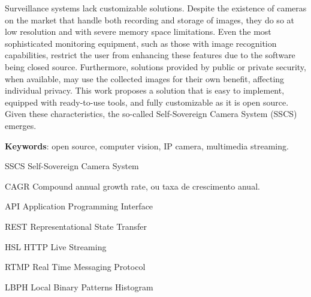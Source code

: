 \documentclass[12pt, %
openright, 
oneside, %
a4paper,    %
brazil]{facom-ufu-abntex2}
\begin{document}
\begin{resumo}[Abstract]

	Surveillance systems lack customizable solutions. Despite the existence of
	cameras on the market that handle both recording and storage of images, they do
	so at low resolution and with severe memory space limitations. Even the most
	sophisticated monitoring equipment, such as those with image recognition
	capabilities, restrict the user from enhancing these features due to the
	software being closed source. Furthermore, solutions provided by public or
	private security, when available, may use the collected images for their own
	benefit, affecting individual privacy. This work proposes a solution that is
	easy to implement, equipped with ready-to-use tools, and fully customizable as
	it is open source. Given these characteristics, the so-called Self-Sovereign
	Camera System (SSCS) emerges.

	\vspace{\onelineskip}
	\noindent
	\textbf{Keywords}: open source, computer vision, IP camera, multimedia streaming.
\end{resumo}

\listoffigures*
\cleardoublepage

\listoftables*
\cleardoublepage

\begin{siglas} %

	\item[SSCS] Self-Sovereign Camera System
	\item[CAGR] Compound annual growth rate, ou taxa de crescimento anual.
	\item[API] Application Programming Interface
	\item[REST] Representational State Transfer
	\item[HSL] HTTP Live Streaming
	\item[RTMP] Real Time Messaging Protocol
	\item[LBPH] Local Binary Patterns Histogram

\end{siglas}

\end{document}
